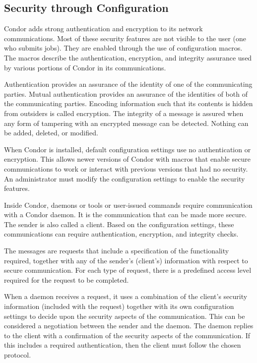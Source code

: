 \subsection{\label{sec:Config-Security} Security through Configuration}

Condor adds strong authentication and encryption to its network
communications.
Most of these security features are not visible to the user
(one who submits jobs).
They are enabled through the use of configuration macros.
The macros describe the authentication, encryption, and
integrity assurance used by various portions of Condor in its communications.

Authentication provides an assurance of the identity of one of the
communicating parties.
Mutual authentication provides an assurance of the identities of
both of the communicating parties.
Encoding information such that its contents is hidden from outsiders
is called encryption.
The integrity of a message is assured when any form of
tampering with an encrypted message can be detected. 
Nothing can be added, deleted, or modified.

When Condor is installed, default configuration settings
use no authentication or encryption.
This allows newer versions of Condor with macros
that enable secure communications to work or interact
with previous versions that had no security.
An administrator must modify the configuration settings to
enable the security features.

Inside Condor, daemons or tools or user-issued commands
require communication with a Condor daemon.
It is the communication that can be made more secure.
The sender is also called a client.
Based on the configuration settings,
these communications can require authentication, encryption,
and integrity checks.

The messages are requests that include
a specification of the functionality required,
together with any of the sender's (client's) information with
respect to secure communication.
For each type of request, there is a predefined access level
required for the request to be completed.

When a daemon receives a request,
it uses a combination of the client's security information
(included with the request)
together with its own configuration settings to decide upon
the security aspects of the communication.
This can be considered a negotiation between the sender and
the daemon.
The daemon replies to the client with a confirmation of
the security aspects of the communication.
If this includes a required authentication, then the
client must follow the chosen protocol.

